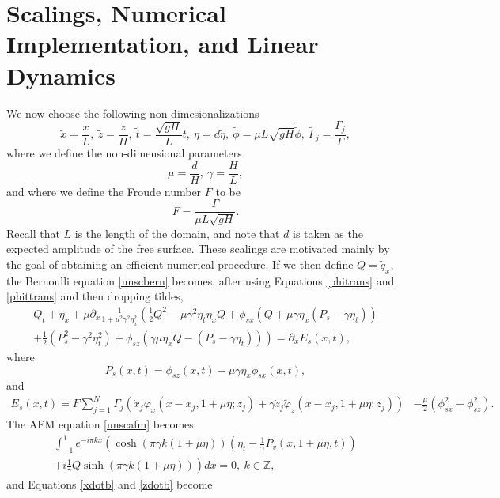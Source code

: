 \documentclass[a4paper,11pt]{article}
\newcommand{\p}{\partial}
\begin{document}
\section{Scalings, Numerical Implementation, and Linear Dynamics}
We now choose the following non-dimesionalizations 
\[
\tilde{x} = \frac{x}{L}, ~\tilde{z} = \frac{z}{H}, ~ \tilde{t} = \frac{\sqrt{gH}}{L} t, ~ \eta = d\tilde{\eta}, ~ \tilde{\phi} = \mu L\sqrt{gH} \tilde{\tilde{\phi}}, ~ \tilde{\Gamma}_{j} = \frac{\Gamma_{j}}{\Gamma},
\]
where we define the non-dimensional parameters
\[
\mu= \frac{d}{H}, ~ \gamma = \frac{H}{L},
\]
and where we define the Froude number $F$ to be 
\[
F = \frac{\Gamma}{\mu L \sqrt{gH}}.
\]
Recall that $L$ is the length of the domain, and note that $d$ is taken as the expected amplitude of the free surface.  These scalings are motivated mainly by the goal of obtaining an efficient numerical procedure.  If we then define $Q = \tilde{q}_{x}$, the Bernoulli equation \eqref{unscbern} becomes, after using Equations \eqref{phitrans} and \eqref{phittrans} and then dropping tildes,  
\begin{multline}
Q_{t} + \eta_{x} + \mu\p_{x}\frac{1}{1+ \mu^{2}\gamma^{2}\eta_{x}^{2}} \left( \frac{1}{2}Q^{2} - \mu \gamma^{2}\eta_{t}\eta_{x}Q  +  \phi_{sx} (Q + \mu\gamma\eta_{x}( P_{s}-\gamma\eta_{t}))   \right. \\
\left. + \frac{1}{2}\left(P_{s}^{2}-\gamma^{2}\eta_{t}^{2} \right)+ \phi_{sz}\left(\gamma \mu \eta_{x}Q-\left(P_{s}-\gamma \eta_{t}\right) \right) \right)= \p_{x}E_{s}(x,t), \label{swbern}
\end{multline}
where 
\[
P_{s}(x,t) = \phi_{sz}(x,t)-\mu\gamma \eta_{x}\phi_{sx}(x,t),
\]
and
\begin{align*}
E_{s}(x,t) =  F\sum_{j=1}^{N}\Gamma_{j}\left(\dot{x}_{j}\varphi_{x}(x-x_{j},1+\mu\eta;z_{j}) + \gamma\dot{z}_{j}\tilde{\varphi}_{z}(x-x_{j},1+\mu\eta;z_{j}) \right)
& -\frac{\mu}{2}\left(\phi_{sx}^{2} + \phi_{sz}^{2}\right).
\end{align*}
The AFM equation \eqref{unscafm} becomes  
\begin{multline}
\int_{-1}^{1} e^{-i\pi k x}\left(\cosh\left( \pi\gamma k (1 + \mu \eta)\right)\left(\eta_{t} - \frac{1}{\gamma}P_{v}(x,1+\mu\eta,t) \right) \right.\\
\left.+i  \frac{1}{\gamma}Q\sinh\left(\pi \gamma k (1 + \mu \eta)\right)\right) dx = 0,~k\in\mathbb{Z},\label{finafm}
\end{multline}
and Equations \eqref{xdotb} and \eqref{zdotb} become
\end{document}
